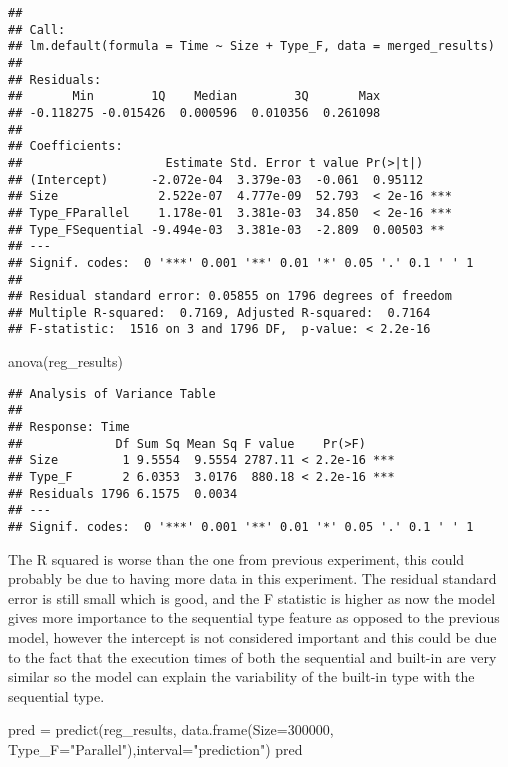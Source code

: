 \documentclass[
]{article}
\newenvironment{Shaded}{\begin{snugshade}}{\end{snugshade}}
\newcommand{\AttributeTok}[1]{\textcolor[rgb]{0.77,0.63,0.00}{#1}}
\newcommand{\DecValTok}[1]{\textcolor[rgb]{0.00,0.00,0.81}{#1}}
\newcommand{\FunctionTok}[1]{\textcolor[rgb]{0.00,0.00,0.00}{#1}}
\newcommand{\NormalTok}[1]{#1}
\newcommand{\OtherTok}[1]{\textcolor[rgb]{0.56,0.35,0.01}{#1}}
\newcommand{\StringTok}[1]{\textcolor[rgb]{0.31,0.60,0.02}{#1}}
\begin{document}
\begin{verbatim}
## 
## Call:
## lm.default(formula = Time ~ Size + Type_F, data = merged_results)
## 
## Residuals:
##       Min        1Q    Median        3Q       Max 
## -0.118275 -0.015426  0.000596  0.010356  0.261098 
## 
## Coefficients:
##                    Estimate Std. Error t value Pr(>|t|)    
## (Intercept)      -2.072e-04  3.379e-03  -0.061  0.95112    
## Size              2.522e-07  4.777e-09  52.793  < 2e-16 ***
## Type_FParallel    1.178e-01  3.381e-03  34.850  < 2e-16 ***
## Type_FSequential -9.494e-03  3.381e-03  -2.809  0.00503 ** 
## ---
## Signif. codes:  0 '***' 0.001 '**' 0.01 '*' 0.05 '.' 0.1 ' ' 1
## 
## Residual standard error: 0.05855 on 1796 degrees of freedom
## Multiple R-squared:  0.7169, Adjusted R-squared:  0.7164 
## F-statistic:  1516 on 3 and 1796 DF,  p-value: < 2.2e-16
\end{verbatim}

\begin{Shaded}
\begin{Highlighting}[]
\FunctionTok{anova}\NormalTok{(reg\_results)}
\end{Highlighting}
\end{Shaded}

\begin{verbatim}
## Analysis of Variance Table
## 
## Response: Time
##             Df Sum Sq Mean Sq F value    Pr(>F)    
## Size         1 9.5554  9.5554 2787.11 < 2.2e-16 ***
## Type_F       2 6.0353  3.0176  880.18 < 2.2e-16 ***
## Residuals 1796 6.1575  0.0034                      
## ---
## Signif. codes:  0 '***' 0.001 '**' 0.01 '*' 0.05 '.' 0.1 ' ' 1
\end{verbatim}

The R squared is worse than the one from previous experiment, this could
probably be due to having more data in this experiment. The residual
standard error is still small which is good, and the F statistic is
higher as now the model gives more importance to the sequential type
feature as opposed to the previous model, however the intercept is not
considered important and this could be due to the fact that the
execution times of both the sequential and built-in are very similar so
the model can explain the variability of the built-in type with the
sequential type.

\begin{Shaded}
\begin{Highlighting}[]
\NormalTok{pred }\OtherTok{=} \FunctionTok{predict}\NormalTok{(reg\_results, }\FunctionTok{data.frame}\NormalTok{(}\AttributeTok{Size=}\DecValTok{300000}\NormalTok{, }\AttributeTok{Type\_F=}\StringTok{"Parallel"}\NormalTok{),}\AttributeTok{interval=}\StringTok{"prediction"}\NormalTok{)}
\NormalTok{pred}
\end{Highlighting}
\end{Shaded}
\end{document}
